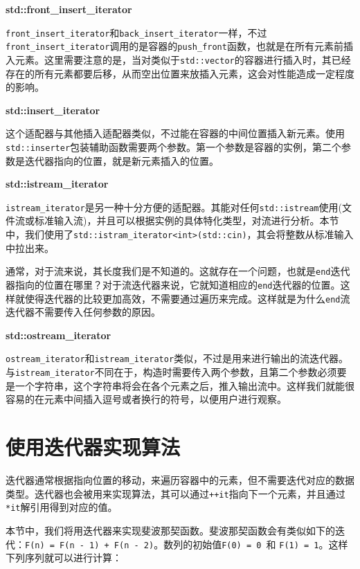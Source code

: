\textbf{std::front\_insert\_iterator}

\texttt{front\_insert\_iterator}和\texttt{back\_insert\_iterator}一样，不过\texttt{front\_insert\_iterator}调用的是容器的\texttt{push\_front}函数，也就是在所有元素前插入元素。这里需要注意的是，当对类似于\texttt{std::vector}的容器进行插入时，其已经存在的所有元素都要后移，从而空出位置来放插入元素，这会对性能造成一定程度的影响。

\textbf{std::insert\_iterator}

这个适配器与其他插入适配器类似，不过能在容器的中间位置插入新元素。使用\texttt{std::inserter}包装辅助函数需要两个参数。第一个参数是容器的实例，第二个参数是迭代器指向的位置，就是新元素插入的位置。

\textbf{std::istream\_iterator}

\texttt{istream\_iterator}是另一种十分方便的适配器。其能对任何\texttt{std::istream}使用(文件流或标准输入流)，并且可以根据实例的具体特化类型，对流进行分析。本节中，我们使用了\texttt{std::istram\_iterator<int>(std::cin)}，其会将整数从标准输入中拉出来。

通常，对于流来说，其长度我们是不知道的。这就存在一个问题，也就是\texttt{end}迭代器指向的位置在哪里？对于流迭代器来说，它就知道相应的\texttt{end}迭代器的位置。这样就使得迭代器的比较更加高效，不需要通过遍历来完成。这样就是为什么\texttt{end}流迭代器不需要传入任何参数的原因。

\textbf{std::ostream\_iterator}

\texttt{ostream\_iterator}和\texttt{istream\_iterator}类似，不过是用来进行输出的流迭代器。与\texttt{istream\_iterator}不同在于，构造时需要传入两个参数，且第二个参数必须要是一个字符串，这个字符串将会在各个元素之后，推入输出流中。这样我们就能很容易的在元素中间插入逗号或者换行的符号，以便用户进行观察。


\section{使用迭代器实现算法}

迭代器通常根据指向位置的移动，来遍历容器中的元素，但不需要迭代对应的数据类型。迭代器也会被用来实现算法，其可以通过\texttt{++it}指向下一个元素，并且通过\texttt{*it}解引用得到对应的值。

本节中，我们将用迭代器来实现斐波那契函数。斐波那契函数会有类似如下的迭代：\texttt{F(n) = F(n - 1) + F(n - 2)}。数列的初始值\texttt{F(0) = 0 }和 \texttt{F(1) = 1}。这样下列序列就可以进行计算：

